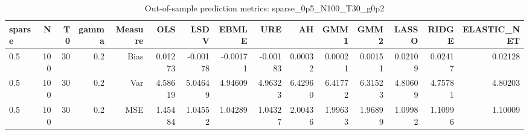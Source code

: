 \begin{table}[!htbp]\centering
\caption{Out-of-sample prediction metrics: sparse_0p5_N100_T30_g0p2}
\label{tab:table3_sparse_0p5_N100_T30_g0p2}
\begin{tabular}{lrrrrrrrrrrrrrr}
\hline
sparse & N & T0 & gamma & Measure & OLS & LSDV & EBMLE & URE & AH & GMM1 & GMM2 & LASSO & RIDGE & ELASTIC_NET \\
\hline
0.5 & 100 & 30 & 0.2 & Bias & 0.01273 & -0.00178 & -0.00171 & -0.00183 & 0.00032 & 0.00021 & 0.00151 & 0.02109 & 0.02417 & 0.02128 \\
0.5 & 100 & 30 & 0.2 & Var & 4.58619 & 5.04649 & 4.94609 & 4.96323 & 6.42960 & 6.41772 & 6.31523 & 4.80609 & 4.75781 & 4.80203 \\
0.5 & 100 & 30 & 0.2 & MSE & 1.45484 & 1.04552 & 1.04289 & 1.04327 & 2.00436 & 1.99633 & 1.96899 & 1.09982 & 1.10996 & 1.10009 \\
\hline
\end{tabular}
\end{table}

